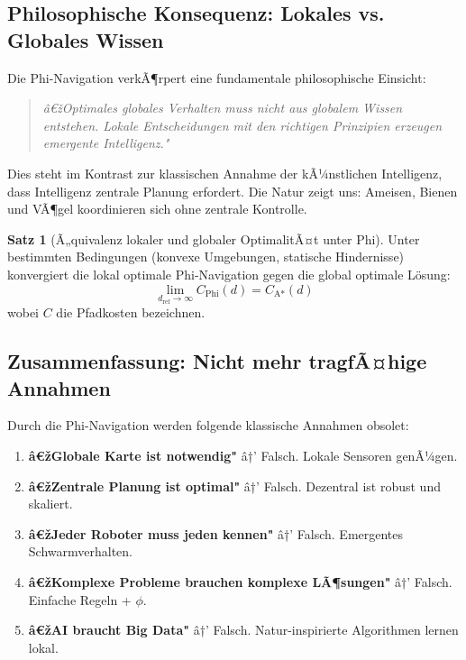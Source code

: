 ﻿\documentclass[a4paper,12pt]{article}
\theoremstyle{definition}
\newtheorem{satz}{Satz}
\begin{document}
\subsection{Philosophische Konsequenz: Lokales vs. Globales Wissen}

Die Phi-Navigation verkÃ¶rpert eine fundamentale philosophische Einsicht:

\begin{quote}
	\textit{â€žOptimales globales Verhalten muss nicht aus globalem Wissen entstehen. Lokale Entscheidungen mit den richtigen Prinzipien erzeugen emergente Intelligenz."}
\end{quote}

Dies steht im Kontrast zur klassischen Annahme der kÃ¼nstlichen Intelligenz, dass Intelligenz zentrale Planung erfordert. Die Natur zeigt uns: Ameisen, Bienen und VÃ¶gel koordinieren sich ohne zentrale Kontrolle.

\begin{satz}[Ã„quivalenz lokaler und globaler OptimalitÃ¤t unter Phi]
	Unter bestimmten Bedingungen (konvexe Umgebungen, statische Hindernisse) konvergiert die lokal optimale Phi-Navigation gegen die global optimale L\"osung:
	\begin{equation}
	\lim_{d_{\text{ref}} \to \infty} C_{\text{Phi}}(d) = C_{\text{A*}}(d)
	\end{equation}
	wobei $C$ die Pfadkosten bezeichnen.
\end{satz}

\subsection{Zusammenfassung: Nicht mehr tragfÃ¤hige Annahmen}

Durch die Phi-Navigation werden folgende klassische Annahmen obsolet:

\begin{enumerate}
	\item \textbf{â€žGlobale Karte ist notwendig"} â†’ Falsch. Lokale Sensoren genÃ¼gen.
	\item \textbf{â€žZentrale Planung ist optimal"} â†’ Falsch. Dezentral ist robust und skaliert.
	\item \textbf{â€žJeder Roboter muss jeden kennen"} â†’ Falsch. Emergentes Schwarmverhalten.
	\item \textbf{â€žKomplexe Probleme brauchen komplexe LÃ¶sungen"} â†’ Falsch. Einfache Regeln + $\phi$.
	\item \textbf{â€žAI braucht Big Data"} â†’ Falsch. Natur-inspirierte Algorithmen lernen lokal.
\end{enumerate}
\end{document}
